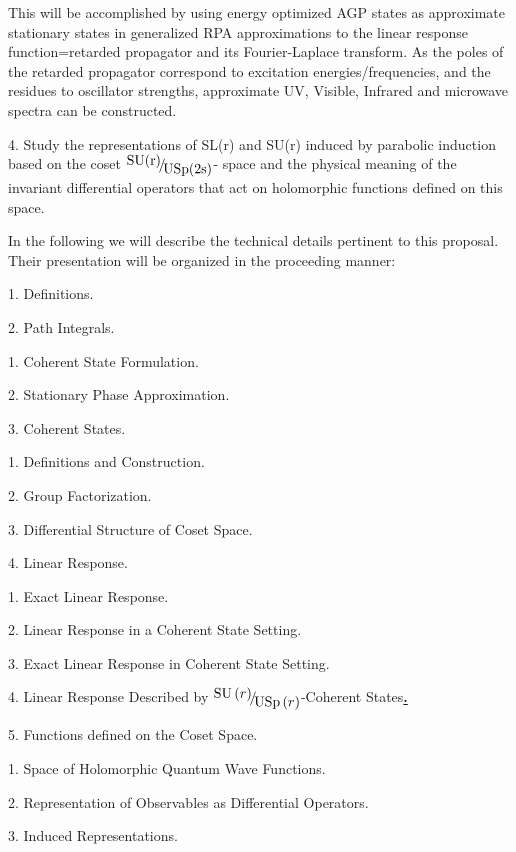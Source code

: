 \documentclass{amsart}
\begin{document}
This will be accomplished by using energy optimized AGP states as
approximate stationary states in generalized RPA approximations to the
linear response function=retarded propagator and its Fourier-Laplace
transform. As the poles of the retarded propagator correspond to excitation
energies/frequencies, and the residues to oscillator strengths, approximate
UV, Visible, Infrared and microwave spectra can be constructed.

4. Study the representations of SL(r) and SU(r) induced by parabolic
induction based on the coset $\raise0.7ex\hbox{${\mbox{SU(r)}}$}
\!\mathord{\left/ {\vphantom {{\mbox{SU(r)}}
{\mbox{USp(2s)}}}}\right.\kern-\nulldelimiterspace}\!\lower0.7ex\hbox{${\mbox{USp(2s)}}$}$-
space and the physical meaning of the invariant differential operators that
act on holomorphic functions defined on this space.

In the following we will describe the technical details pertinent to this
proposal. Their presentation will be organized in the proceeding manner:

1. Definitions.

2. Path Integrals.

1. Coherent State Formulation.

2. Stationary Phase Approximation.

3. Coherent States.

1. Definitions and Construction.

2. Group Factorization.

3. Differential Structure of Coset Space.

4. Linear Response.

1. Exact Linear Response.

2. Linear Response in a Coherent State Setting.

3. Exact Linear Response in Coherent State Setting.

4. Linear Response Described by $\raise0.7ex\hbox{${\mbox{SU}\left( r
\right)}$} \!\mathord{\left/ {\vphantom {{\mbox{SU}\left( r \right)}
{\mbox{USp}\left( r
\right)}}}\right.\kern-\nulldelimiterspace}\!\lower0.7ex\hbox{${\mbox{USp}\left(
r \right)}$}$-Coherent States\underline {\textbf{.}}

5. Functions defined on the Coset Space.

1. Space of Holomorphic Quantum Wave Functions.

2. Representation of Observables as Differential Operators.

3. Induced Representations.
\end{document}
